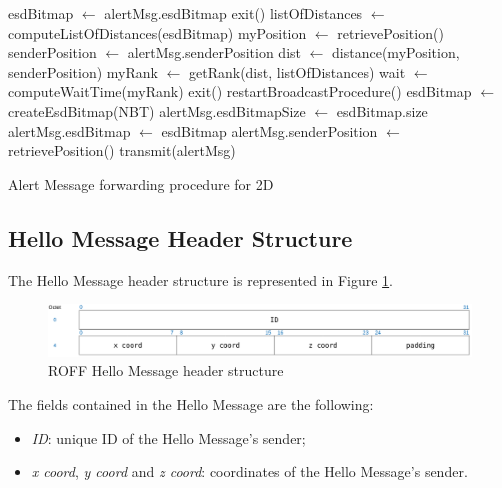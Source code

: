 		\begin{algorithm}[H]
			\begin{algorithmic}[1]
				\State esdBitmap $\gets$ alertMsg.esdBitmap
				\State exit()
				\Else
				\State listOfDistances $\gets$ computeListOfDistances(esdBitmap)
				\State myPosition $\gets$ retrievePosition()
				\State senderPosition $\gets$ alertMsg.senderPosition
				\State dist $\gets$ distance(myPosition, senderPosition)
				\State myRank $\gets$ getRank(dist, listOfDistances)
				\State wait $\gets$ computeWaitTime(myRank)
				\State exit()
				\State restartBroadcastProcedure()
				\Else
				\State esdBitmap $\gets$ createEsdBitmap(NBT)
				\State alertMsg.esdBitmapSize $\gets$ esdBitmap.size
				\State alertMsg.esdBitmap $\gets$ esdBitmap
				\State alertMsg.senderPosition $\gets$ retrievePosition()
				\State transmit(alertMsg)
				\EndIf 
				\EndIf
			\end{algorithmic}
			\caption{Alert Message forwarding procedure for 2D}
			\label{alg:roff-alert-message-forwarding}
		\end{algorithm}
		
		
		\subsection{Hello Message Header Structure}
			The Hello Message header structure is represented in Figure \ref{fig:roffHelloHeader}.
				
			\begin{figure}[H]
				\centering
				\includegraphics[width=\textwidth]{immagini/roffHelloHeader}
				\caption{ROFF Hello Message header structure}
				\label{fig:roffHelloHeader}
			\end{figure}
				
			The fields contained in the Hello Message are the following:
			\begin{itemize}
				\item \textit{ID}: unique ID of the Hello Message's sender;
				\item \textit{x coord}, \textit{y coord} and \textit{z coord}: coordinates of the Hello Message's sender.
			\end{itemize}
		
